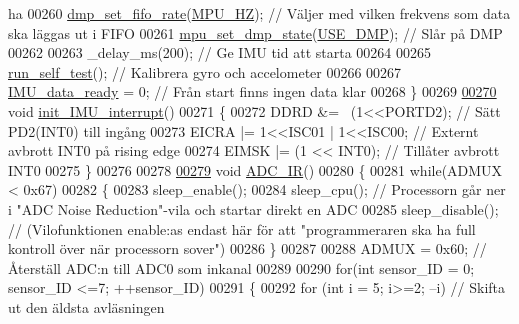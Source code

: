 \begin{DoxyCode}
{       ha}
00260     \hyperlink{group___d_r_i_v_e_r_s_ga5399728fd572a7694af20286cc9d4121}{dmp\_set\_fifo\_rate}(\hyperlink{sensor_8h_a7f881c6b2bb1dccd733c018dff655691}{MPU\_HZ});                                               \textcolor{comment}{//
       Väljer med vilken frekvens som data ska läggas ut i FIFO}
00261     \hyperlink{group___d_r_i_v_e_r_s_ga68ed20e6c9663cd7c50469329af8715f}{mpu\_set\_dmp\_state}(\hyperlink{sensor_8h_a8726913025efbadec677580f19a7535d}{USE\_DMP});                                             \textcolor{comment}{// Slår
       på DMP}
00262 
00263     \_delay\_ms(200);                                                         \textcolor{comment}{// Ge IMU tid att starta}
00264 
00265     \hyperlink{sensor_8c_abf51091638bfe4a1e4479fa12a95b0a9}{run\_self\_test}();                                                       \textcolor{comment}{// Kalibrera gyro
       och accelometer}
00266 
00267     \hyperlink{sensor_8h_aada9974f9914a0bef6efe028d48ae383}{IMU\_data\_ready} = 0;                                                           \textcolor{comment}{// Från
       start finns ingen data klar}
00268 \}
00269 
\hypertarget{sensor_8c_source.tex_l00270}{}\hyperlink{sensor_8h_ad53a97524cf65efb444e93e9061d9353}{00270} \textcolor{keywordtype}{void} \hyperlink{sensor_8c_ad53a97524cf65efb444e93e9061d9353}{init\_IMU\_interrupt}()
00271 \{
00272     DDRD &= ~(1<<PORTD2);               \textcolor{comment}{// Sätt PD2(INT0) till ingång}
00273     EICRA |= 1<<ISC01 | 1<<ISC00;       \textcolor{comment}{// Externt avbrott INT0 på rising edge}
00274     EIMSK |= (1 << INT0);               \textcolor{comment}{// Tillåter avbrott INT0}
00275 \}
00276 
00278 
\hypertarget{sensor_8c_source.tex_l00279}{}\hyperlink{sensor_8h_a41da5db2af35bde04662acc0c8ed5e22}{00279} \textcolor{keywordtype}{void} \hyperlink{sensor_8c_a41da5db2af35bde04662acc0c8ed5e22}{ADC\_IR}()
00280 \{
00281     \textcolor{keywordflow}{while}(ADMUX < 0x67)
00282     \{
00283         sleep\_enable();
00284         sleep\_cpu();            \textcolor{comment}{// Processorn går ner i "ADC Noise Reduction"-vila och startar direkt en
       ADC}
00285         sleep\_disable();        \textcolor{comment}{// (Vilofunktionen enable:as endast här för att "programmeraren ska ha full
       kontroll över när processorn sover")}
00286     \}
00287 
00288     ADMUX = 0x60;               \textcolor{comment}{// Återställ ADC:n till ADC0 som inkanal}
00289 
00290     \textcolor{keywordflow}{for}(\textcolor{keywordtype}{int} sensor\_ID = 0; sensor\_ID <=7; ++sensor\_ID)
00291     \{
00292         \textcolor{keywordflow}{for} (\textcolor{keywordtype}{int} i = 5; i>=2; --i)      \textcolor{comment}{// Skifta ut den äldsta avläsningen}

\end{DoxyCode}
